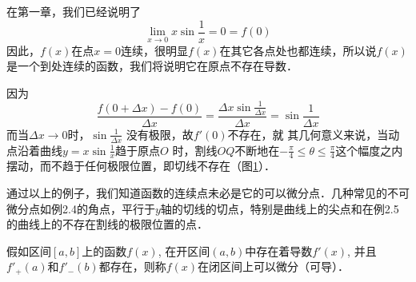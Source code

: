 \begin{solution}
在第一章，我们已经说明了
\[\lim_{x\to 0}x\sin\frac{1}{x}=0=f(0)\]
因此，$f(x)$在点$x=0$连续，很明显$f(x)$在其它各点处也都连续，所以说$f(x)$是一个到处连续的函数，我们将说明它在原点不存在导数．

因为
\[\frac{f(0+\Delta x)-f(0)}{\Delta x}=\frac{\Delta x\sin\frac{1}{\Delta x}}{\Delta x}=\sin\frac{1}{\Delta x}\]
而当$\Delta x\to 0$时，$\sin\frac{1}{\Delta x}$
没有极限，故$f'(0)$不存在，就
其几何意义来说，当动点沿着曲线$y=x\sin\frac{1}{x}$趋于原点$O$
时，割线$OQ$不断地在$-\frac{\pi}{4}\le \theta\le \frac{\pi}{4}$这个幅度之内摆动，而不趋于任何极限位置，即切线不存在（图\ref{fig:x*sin(1/x)}）．
\end{solution}

\begin{figure}[htp]
    \centering
{}
    \caption{}\label{fig:x*sin(1/x)}
\end{figure}

通过以上的例子，我们知道函数的连续点未必是它的可以微分点．几种常见的不可微分点如例2.4的角点，平行于$y$轴的切线的切点，特别是曲线上的尖点和在例2.5的曲线上的不存在割线的极限位置的点．

假如区间$[a,b]$上的函数$f(x)$, 在开区间$(a,b)$中存在着导数$f'(x)$, 并且$f'_+(a)$和$f'_-(b)$都存在，则称$f(x)$在闭区间上可以微分（可导）．

